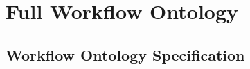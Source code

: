 \chapter*{Full Workflow Ontology}
\label{app:full-ontology}

\section{Workflow Ontology Specification}


